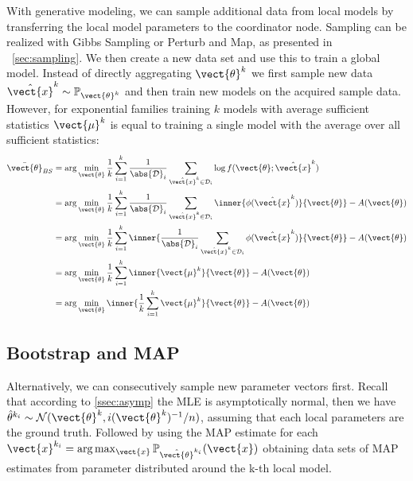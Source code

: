 With generative modeling, we can sample additional data from local models by transferring the local model parameters to the coordinator node.
Sampling can be realized with Gibbs Sampling or Perturb and Map, as presented in \sect~\ref{sec:sampling}.
We then create a new data set and use this to train a  global model. 
Instead of directly aggregating $\vect{\theta}^k$ we first sample new data  $\hat{\vect{x}}^k \sim \mathbb{P}_{\vect{\theta}^k}$ and then train new models on the acquired sample data.
However, for exponential families training $k$ models with average sufficient statistics $\vect{\mu}^k$ is equal to training a single model with the average over all sufficient statistics:
\begin{equation}
    \begin{split}
        \bar{\vect{\theta}}_{BS} &= \arg\min_{\vect{\theta}} \frac{1}{k}\sum_{i=1}^k \frac{1}{\abs{\mathcal{D}}_i} \sum_{\hat{\vect{x}}^k \in \mathcal{D}_i} \log f(\vect{\theta}; \hat{\vect{x}}^k) \\
        &=  \arg\min_{\vect{\theta}} \frac{1}{k}\sum_{i=1}^k \frac{1}{\abs{\mathcal{D}}_i} \sum_{\hat{\vect{x}}^k \in \mathcal{D}_i} \inner{\phi(\hat{\vect{x}}^k)}{\vect{\theta}} - A(\vect{\theta}) \\
        &= \arg\min_{\vect{\theta}} \frac{1}{k}\sum_{i=1}^k \inner{\frac{1}{\abs{\mathcal{D}}_i} \sum_{\hat{\vect{x}}^k \in \mathcal{D}_i} \phi(\hat{\vect{x}}^k)}{\vect{\theta}} - A(\vect{\theta}) \\
        &= \arg\min_{\vect{\theta}} \frac{1}{k}\sum_{i=1}^k \inner{\vect{\mu}^k}{\vect{\theta}} - A(\vect{\theta}) \\
        & =  \arg\min_{\vect{\theta}} \inner{\frac{1}{k}\sum_{i=1}^k  \vect{\mu}^k}{\vect{\theta}} - A(\vect{\theta})
    \end{split}
\end{equation}

\subsection{Bootstrap and MAP}
Alternatively, we can consecutively sample new parameter vectors first.
Recall that according to \ref{ssec:asymp} the MLE is asymptotically normal, then we have $\hat{\theta}^{k_i}  \sim \mathcal{N}(\vect{\theta}^k, i(\vect{\theta}^k)^{-1}/n)$, assuming that each local parameters are the ground truth.
Followed by using the MAP estimate for each $\vect{x}^{k_i} = \arg\max_{\vect{x}} \mathbb{P}_{\hat{\vect{\theta}}^{k_i}}(\vect{x})$ obtaining data sets of MAP estimates from parameter distributed around the k-th local model.



